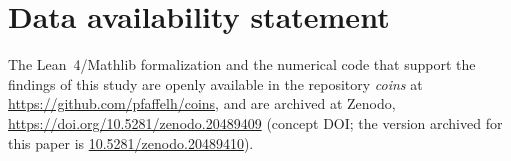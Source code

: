 \documentclass[12pt]{article}
\theoremstyle{definition}
\theoremstyle{remark}
\begin{document}
\section*{Data availability statement}

The Lean~4/Mathlib formalization and the numerical code that support
the findings of this study are openly available in the repository
\emph{coins} at \url{https://github.com/pfaffelh/coins}, and are
archived at Zenodo,
\url{https://doi.org/10.5281/zenodo.20489409} (concept DOI; the
version archived for this paper is
\href{https://doi.org/10.5281/zenodo.20489410}{10.5281/zenodo.20489410}).


\end{document}
